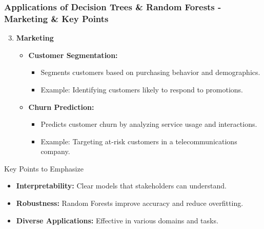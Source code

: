 \documentclass{beamer}
\begin{document}
\begin{frame}
    \frametitle{Applications of Decision Trees \& Random Forests - Marketing \& Key Points}
    \begin{enumerate}
        \setcounter{enumi}{2}
        \item \textbf{Marketing}
        \begin{itemize}
            \item \textbf{Customer Segmentation:} 
            \begin{itemize}
                \item Segments customers based on purchasing behavior and demographics.
                \item Example: Identifying customers likely to respond to promotions.
            \end{itemize}
            \item \textbf{Churn Prediction:}
            \begin{itemize}
                \item Predicts customer churn by analyzing service usage and interactions.
                \item Example: Targeting at-risk customers in a telecommunications company.
            \end{itemize}
        \end{itemize}
    \end{enumerate}
    
    \begin{block}{Key Points to Emphasize}
        \begin{itemize}
            \item \textbf{Interpretability:} Clear models that stakeholders can understand.
            \item \textbf{Robustness:} Random Forests improve accuracy and reduce overfitting.
            \item \textbf{Diverse Applications:} Effective in various domains and tasks.
        \end{itemize}
    \end{block}
\end{frame}
\end{document}
